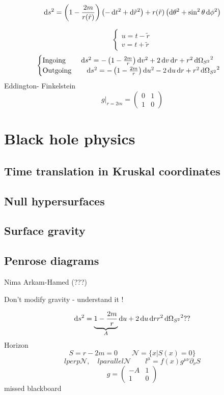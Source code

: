\[ \operatorname{d \!}{s}^2 = \left(1- \frac{2m}{r(\tilde{r})}\right)\left(- \operatorname{d \!}{t}^2 + \operatorname{d \!}{\tilde{r}}^2\right) + r(\tilde{r})\left(\operatorname{d \!}{\theta}^2 + \sin^2\theta \operatorname{d \!}{\phi}^2\right) \]

\[ \begin{cases}
u = t-\tilde{r} \\
v = t+ \tilde{r}
\end{cases} \]
\[ \begin{cases}
\text{Ingoing} \qquad \diff{s}^2 = - \left(1- \frac{2m}{r}\right)\diff{v}^2 + 2 \diff{v}\diff{r} + r^2 \diff{\Omega_{S^2}}^2 \\
\text{Outgoing} \qquad \diff{s}^2 = - \left(1- \frac{2m}{r}\right)\diff{u}^2 - 2 \diff{u}\diff{r} + r^2 \diff{\Omega_{S^2}}^2
\end{cases} \]
Eddington- Finkelstein
\[ g|_{r=2m} = \begin{pmatrix}
0 & 1 \\ 1 & 0
\end{pmatrix} \]


\chapter{Black hole physics}
\section{Time translation in Kruskal coordinates}
\section{Null hypersurfaces}
\section{Surface gravity}
\section{Penrose diagrams}

Nima Arkam-Hamed (???)

Don't modify gravity - understand it !

\[ \operatorname{d \!}{s}^2 = \underbrace{1- \frac{2m}{r}}_{A}\operatorname{d \!}{u} + 2 \operatorname{d \!}{u}\operatorname{d \!}{r} r^2 \operatorname{d \!}{\Omega_{S^2}}^2 ?? \]
Horizon
\[ S = r - 2m = 0 \qquad \mathcal{N} = \{x|S(x)=0\} \]
\[ l perp \mathcal{N}, \quad l parallel \mathcal{N} \qquad l^\mu = f(x)g^{\mu\nu}\partial_\nu S \]
\[ g = \begin{pmatrix}
-A & 1 \\ 1 & 0
\end{pmatrix} \]
missed blackboard

